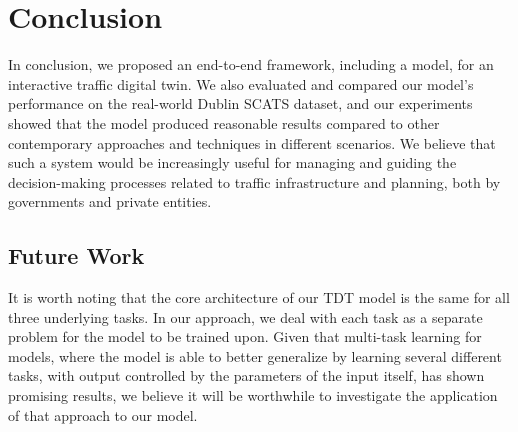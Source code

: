 \section{Conclusion}\label{sec:conclusion}
In conclusion, we proposed an end-to-end framework, including a model, for an interactive traffic digital twin. We also evaluated and compared our model's performance on the real-world Dublin SCATS dataset, and our experiments showed that the model produced reasonable results compared to other contemporary approaches and techniques in different scenarios. We believe that such a system would be increasingly useful for managing and guiding the decision-making processes related to traffic infrastructure and planning, both by governments and private entities.



\subsection*{Future Work}
It is worth noting that the core architecture of our TDT model is the same for all three underlying tasks. In our approach, we deal with each task as a separate problem for the model to be trained upon. Given that multi-task learning for models, where the model is able to better generalize by learning several different tasks, with output controlled by the parameters of the input itself, has shown promising results, we believe it will be worthwhile to investigate the application of that approach to our model.
